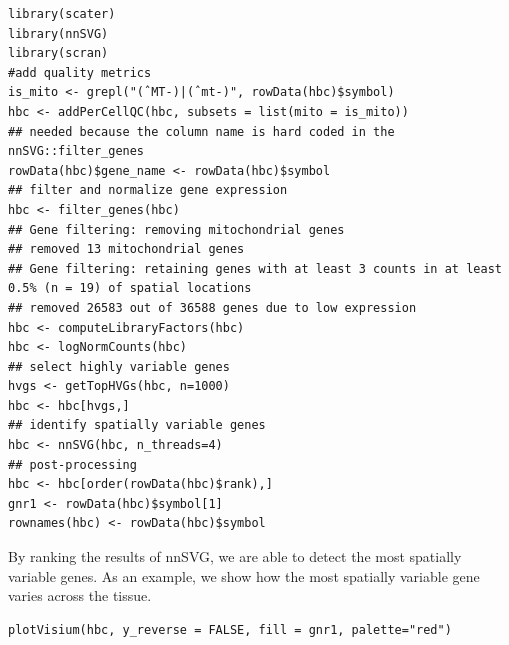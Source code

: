 \documentclass[graybox]{svmult}
\begin{document}
\begin{shaded}
\begin{verbatim}
library(scater)
library(nnSVG)
library(scran)
#add quality metrics
is_mito <- grepl("(ˆMT-)|(ˆmt-)", rowData(hbc)$symbol)
hbc <- addPerCellQC(hbc, subsets = list(mito = is_mito))
## needed because the column name is hard coded in the nnSVG::filter_genes
rowData(hbc)$gene_name <- rowData(hbc)$symbol
## filter and normalize gene expression
hbc <- filter_genes(hbc)
## Gene filtering: removing mitochondrial genes
## removed 13 mitochondrial genes
## Gene filtering: retaining genes with at least 3 counts in at least 0.5% (n = 19) of spatial locations
## removed 26583 out of 36588 genes due to low expression
hbc <- computeLibraryFactors(hbc)
hbc <- logNormCounts(hbc)
## select highly variable genes
hvgs <- getTopHVGs(hbc, n=1000)
hbc <- hbc[hvgs,]
## identify spatially variable genes
hbc <- nnSVG(hbc, n_threads=4)
## post-processing
hbc <- hbc[order(rowData(hbc)$rank),]
gnr1 <- rowData(hbc)$symbol[1]
rownames(hbc) <- rowData(hbc)$symbol
\end{verbatim}
\end{shaded}

By ranking the results of nnSVG, we are able to detect the most spatially
variable genes. As an example, we show how the most spatially variable gene varies
across the tissue.


\begin{shaded}
\begin{verbatim}
plotVisium(hbc, y_reverse = FALSE, fill = gnr1, palette="red")
\end{verbatim}
\end{shaded}
\end{document}

